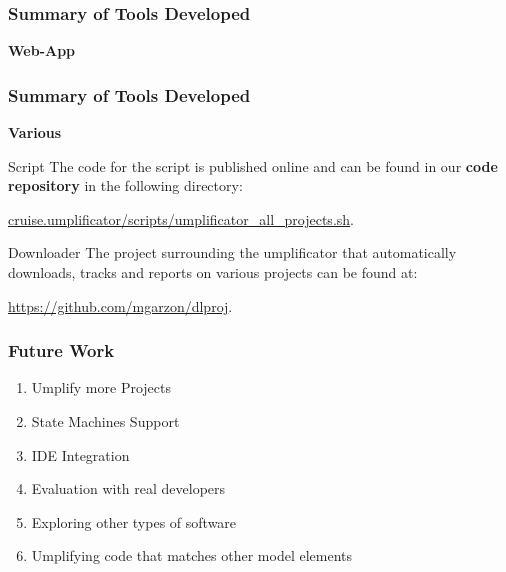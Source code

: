 \documentclass[xcolor=table]{beamer}
\begin{document}
\begin{frame}
\frametitle{Summary of Tools Developed}
\textcolor{important}{\textbf{Web-App}}
\begin{figure}[h]
\centering
{}
\end{figure}
\end{frame}

\begin{frame}
\frametitle{Summary of Tools Developed}
\textcolor{important}{\textbf{Various}}
\begin{block} {Script}
The code for the script is published online and can be found in our \textbf{code repository} in the following directory:

\url{cruise.umplificator/scripts/umplificator_all_projects.sh}.
\end{block}
\begin{block} {Downloader}
The project surrounding the umplificator that automatically downloads, tracks and reports on various projects can be found at: 

\url{https://github.com/mgarzon/dlproj}.
\end{block}
\end{frame}

\begin{frame}
\frametitle{Future Work}
\begin{enumerate}
\item {\large Umplify more Projects}
\item {\large State Machines Support} 
\item {\large IDE Integration}
\item {\large Evaluation with real developers}
\item {\large Exploring other types of software}
\item {\large Umplifying code that matches other model elements}
\end{enumerate}
\end{frame}
\end{document}

